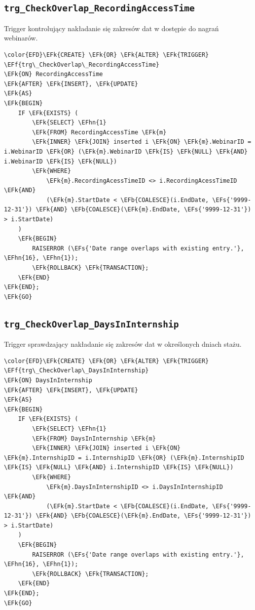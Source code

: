 \documentclass[11pt]{article}
\newcommand{\EFs}[1]{\textcolor{EFs}{#1}} %
\newcommand{\EFk}[1]{\textcolor{EFk}{\textbf{#1}}} %
\newcommand{\EFb}[1]{\textcolor{EFb}{\textbf{#1}}} %
\newcommand{\EFf}[1]{\textcolor{EFf}{#1}} %
\newcommand{\EFhn}[1]{\textcolor{EFhn}{#1}} %
\begin{document}
\subsection{\texttt{trg\_CheckOverlap\_RecordingAccessTime}}
\label{sec:org3698d59}
Trigger kontrolujący nakładanie się zakresów dat w dostępie do nagrań webinarów.
\begin{Code}
\begin{Verbatim}
\color{EFD}\EFk{CREATE} \EFk{OR} \EFk{ALTER} \EFk{TRIGGER} \EFf{trg\_CheckOverlap\_RecordingAccessTime}
\EFk{ON} RecordingAccessTime
\EFk{AFTER} \EFk{INSERT}, \EFk{UPDATE}
\EFk{AS}
\EFk{BEGIN}
    IF \EFk{EXISTS} (
        \EFk{SELECT} \EFhn{1} 
        \EFk{FROM} RecordingAccessTime \EFk{m}
        \EFk{INNER} \EFk{JOIN} inserted i \EFk{ON} \EFk{m}.WebinarID = i.WebinarID \EFk{OR} (\EFk{m}.WebinarID \EFk{IS} \EFk{NULL} \EFk{AND} i.WebinarID \EFk{IS} \EFk{NULL})
        \EFk{WHERE} 
            \EFk{m}.RecordingAcessTimeID <> i.RecordingAcessTimeID \EFk{AND}
            (\EFk{m}.StartDate < \EFb{COALESCE}(i.EndDate, \EFs{'9999-12-31'}) \EFk{AND} \EFb{COALESCE}(\EFk{m}.EndDate, \EFs{'9999-12-31'}) > i.StartDate)
    )
    \EFk{BEGIN}
        RAISERROR (\EFs{'Date range overlaps with existing entry.'}, \EFhn{16}, \EFhn{1});
        \EFk{ROLLBACK} \EFk{TRANSACTION};
    \EFk{END}
\EFk{END};
\EFk{GO}
\end{Verbatim}
\end{Code}
\subsection{\texttt{trg\_CheckOverlap\_DaysInInternship}}
\label{sec:org4705b4b}
Trigger sprawdzający nakładanie się zakresów dat w określonych dniach stażu.
\begin{Code}
\begin{Verbatim}
\color{EFD}\EFk{CREATE} \EFk{OR} \EFk{ALTER} \EFk{TRIGGER} \EFf{trg\_CheckOverlap\_DaysInInternship}
\EFk{ON} DaysInInternship
\EFk{AFTER} \EFk{INSERT}, \EFk{UPDATE}
\EFk{AS}
\EFk{BEGIN}
    IF \EFk{EXISTS} (
        \EFk{SELECT} \EFhn{1} 
        \EFk{FROM} DaysInInternship \EFk{m}
        \EFk{INNER} \EFk{JOIN} inserted i \EFk{ON} \EFk{m}.InternshipID = i.InternshipID \EFk{OR} (\EFk{m}.InternshipID \EFk{IS} \EFk{NULL} \EFk{AND} i.InternshipID \EFk{IS} \EFk{NULL})
        \EFk{WHERE} 
            \EFk{m}.DaysInInternshipID <> i.DaysInInternshipID \EFk{AND}
            (\EFk{m}.StartDate < \EFb{COALESCE}(i.EndDate, \EFs{'9999-12-31'}) \EFk{AND} \EFb{COALESCE}(\EFk{m}.EndDate, \EFs{'9999-12-31'}) > i.StartDate)
    )
    \EFk{BEGIN}
        RAISERROR (\EFs{'Date range overlaps with existing entry.'}, \EFhn{16}, \EFhn{1});
        \EFk{ROLLBACK} \EFk{TRANSACTION};
    \EFk{END}
\EFk{END};
\EFk{GO}
\end{Verbatim}
\end{Code}
\end{document}

